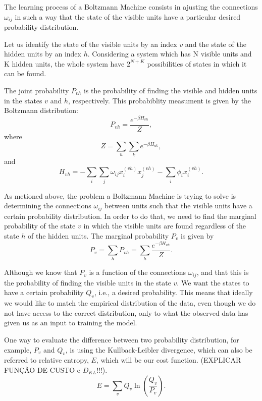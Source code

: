 The learning process of a Boltzmann Machine consists in ajusting the connections $\omega_{ij}$ in such a way that the state of the visible units have a particular desired probability distribution.

Let us identify the state of the visible units by an index $v$ and the state of the hidden units by an index $h$. 
Considering a system which has N visible units and K hidden units, the whole system have $2^{N + K}$ possibilities of states in which it can be found.

The joint probability $P_{vh}$ is the probability of finding the visible and hidden units in the states $v$ and $h$, respectively. 
This probabiblity measument is given by the Boltzmann distribution:
\begin{equation}
  P_{vh} = \frac{e^{-\beta H_{vh}}}{Z},
  \label{eq:eq8}
\end{equation}
where
\begin{equation}
  Z = \sum_{u} \sum_{k} e^{-\beta H_{uk}},
  \label{eq:eq9}
\end{equation}
and
\begin{equation}
  H_{vh} = - \sum_{i} \sum_{j} \omega_{ij} x^{(vh)}_{i} x^{(vh)}_{j} - \sum_{i} \phi_{i} x^{(vh)}_{i}.
  \label{eq:eq10}
\end{equation}

As metioned above, the problem a Boltzmann Machine is trying to solve is determining the connections $\omega_{ij}$ between units such that the visible units have a certain probability distribution. 
In order to do that, we need to find the marginal probability of the state $v$ in which the visible units are found regardless of the state $h$ of the hidden units. The marginal probability $P_{v}$ is given by
\begin{equation}
  P_{v} = \sum_{h} P_{vh} = \sum_{h} \frac{e^{-\beta H_{vh}}}{Z}.
  \label{eq:marginal_prob}
\end{equation}

Although we know that $P_{v}$ is a function of the connections $\omega_{ij}$, and that this is the probability of finding the visible units in the state $v$. We want the states to have a certain probability $Q_{v}$, i.e., a desired probability. 
This means that ideally we would like to match the empirical distribution of the data, even though we do not have access to the correct distribution, only to what the observed data has given us as an input to training the model.

One way to evaluate the difference between two probability distribution, for example, $P_{v}$ and $Q_{v}$, is using the Kullback-Leibler divergence, which can also be referred to relative entropy, $E$, which will be our cost function. 
(EXPLICAR FUN\c{C}\~{A}O DE CUSTO e $D_{KL}$!!!).
\begin{equation}
  E = \sum_{v} Q_{v} \ln{\left(\frac{Q_{v}}{P_{v}}\right)}.
  \label{eq:DKL}
\end{equation}

